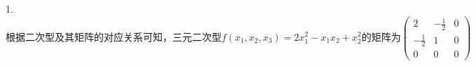 1.$\mathrm{根据二次型及其矩阵的对应关系可知}，\mathrm{三元二次型}f(x_1,x_2,x_3)=2x_1^2-x_1x_2+x_2^2\mathrm{的矩阵为}\begin{pmatrix}2&-\frac12&0\\-\frac12&1&0\\0&0&0\end{pmatrix}$